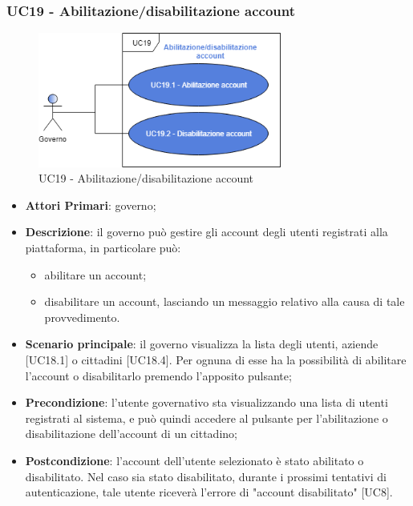 \subsubsection{UC19 - Abilitazione/disabilitazione account}
\begin{figure}[h]
	\includegraphics[width=8cm]{res/images/UC19.png}
	\centering
	\caption{UC19 - Abilitazione/disabilitazione account}
\end{figure}
\begin{itemize}
	\item \textbf{Attori Primari}:
	governo;
	\item \textbf{Descrizione}: il governo può gestire gli account degli utenti registrati alla piattaforma, in particolare può:
	\begin{itemize}
		\item abilitare un account;
		\item disabilitare un account, lasciando un messaggio relativo alla causa di tale provvedimento.
	\end{itemize}
	\item \textbf{Scenario principale}: il governo visualizza la lista degli utenti, aziende [UC18.1] o cittadini [UC18.4]. Per ognuna di esse ha la possibilità di abilitare l'account o disabilitarlo premendo l'apposito pulsante;
	\item \textbf{Precondizione}: l'utente governativo sta visualizzando una lista di utenti registrati al sistema, e può quindi accedere al pulsante per l'abilitazione o disabilitazione dell'account di un cittadino;
	\item \textbf{Postcondizione}: l'account dell'utente selezionato è stato abilitato o disabilitato. Nel caso sia stato disabilitato, durante i prossimi tentativi di autenticazione, tale utente riceverà l'errore di "account disabilitato" [UC8].
\end{itemize} 

